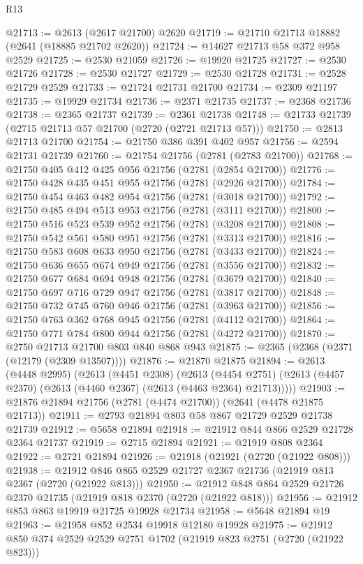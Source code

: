 \begin{lexlean}{R13}
\begin{coremodule}
@21713 := @2613 (@2617 @21700) @2620
@21719 := @21710 @21713 @18882 (@2641 (@18885 @21702 @2620))
@21724 := @14627 @21713 @58 @372 @958 @2529
@21725 := @2530 @21059
@21726 := @19920 @21725
@21727 := @2530 @21726
@21728 := @2530 @21727
@21729 := @2530 @21728
@21731 := @2528 @21729 @2529
@21733 := @21724 @21731 @21700
@21734 := @2309 @21197
@21735 := @19929 @21734
@21736 := @2371 @21735
@21737 := @2368 @21736
@21738 := @2365 @21737
@21739 := @2361 @21738
@21748 := @21733 @21739 (@2715 @21713 @57 @21700 (@2720 (@2721 @21713 @57)))
@21750 := @2813 @21713 @21700
@21754 := @21750 @386 @391 @402 @957
@21756 := @2594 @21731 @21739
@21760 := @21754 @21756 (@2781 (@2783 @21700))
@21768 := @21750 @405 @412 @425 @956 @21756 (@2781 (@2854 @21700))
@21776 := @21750 @428 @435 @451 @955 @21756 (@2781 (@2926 @21700))
@21784 := @21750 @454 @463 @482 @954 @21756 (@2781 (@3018 @21700))
@21792 := @21750 @485 @494 @513 @953 @21756 (@2781 (@3111 @21700))
@21800 := @21750 @516 @523 @539 @952 @21756 (@2781 (@3208 @21700))
@21808 := @21750 @542 @561 @580 @951 @21756 (@2781 (@3313 @21700))
@21816 := @21750 @583 @608 @633 @950 @21756 (@2781 (@3433 @21700))
@21824 := @21750 @636 @655 @674 @949 @21756 (@2781 (@3556 @21700))
@21832 := @21750 @677 @684 @694 @948 @21756 (@2781 (@3679 @21700))
@21840 := @21750 @697 @716 @729 @947 @21756 (@2781 (@3817 @21700))
@21848 := @21750 @732 @745 @760 @946 @21756 (@2781 (@3963 @21700))
@21856 := @21750 @763 @362 @768 @945 @21756 (@2781 (@4112 @21700))
@21864 := @21750 @771 @784 @800 @944 @21756 (@2781 (@4272 @21700))
@21870 := @2750 @21713 @21700 @803 @840 @868 @943
@21875 := @2365 (@2368 (@2371 (@12179 (@2309 @13507))))
@21876 := @21870 @21875
@21894 := @2613
    (@4448 @2995)
    (@2613
      (@4451 @2308)
      (@2613
        (@4454 @2751)
        (@2613 (@4457 @2370) (@2613 (@4460 @2367) (@2613 (@4463 @2364) @21713)))))
@21903 := @21876 @21894 @21756 (@2781 (@4474 @21700)) (@2641 (@4478 @21875 @21713))
@21911 := @2793 @21894 @803 @58 @867 @21729 @2529 @21738 @21739
@21912 := @5658 @21894
@21918 := @21912 @844 @866 @2529 @21728 @2364 @21737
@21919 := @2715 @21894
@21921 := @21919 @808 @2364
@21922 := @2721 @21894
@21926 := @21918 (@21921 (@2720 (@21922 @808)))
@21938 := @21912 @846 @865 @2529 @21727 @2367 @21736 (@21919 @813 @2367 (@2720 (@21922 @813)))
@21950 := @21912 @848 @864 @2529 @21726 @2370 @21735 (@21919 @818 @2370 (@2720 (@21922 @818)))
@21956 := @21912 @853 @863 @19919 @21725 @19928 @21734
@21958 := @5648 @21894 @19
@21963 := @21958 @852 @2534 @19918 @12180 @19928
@21975 := @21912 @850 @374 @2529 @2529 @2751 @1702 (@21919 @823 @2751 (@2720 (@21922 @823)))

\end{coremodule}
\end{lexlean}
